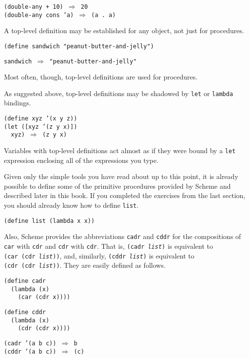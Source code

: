 \begin{alltt}
(double-any + 10) \(\Rightarrow\) 20
(double-any cons 'a) \(\Rightarrow\) (a . a)
\end{alltt}


A top-level definition may be established for any object, not just
for procedures.


\begin{alltt}
(define sandwich "peanut-butter-and-jelly")

sandwich \(\Rightarrow\) "peanut-butter-and-jelly"
\end{alltt}


\label{start_s80}Most often, though, top-level definitions are
used for procedures.


\label{start_s81}As suggested above, top-level definitions may be shadowed
by \texttt{let} or \texttt{lambda} bindings.


\begin{alltt}
(define xyz '(x y z))
(let ([xyz '(z y x)])
  xyz) \(\Rightarrow\) (z y x)
\end{alltt}


Variables with top-level definitions act almost as if they were bound
by a \texttt{let} expression enclosing all of the expressions you type.


\label{start_defn_list}Given only the simple tools you have read about up to this point,
it is already possible to define some of the primitive procedures
provided by Scheme and described later in this book.
If you completed the exercises from the last section, you should
already know how to define \label{start_s82}\texttt{list}.


\texttt{(define list (lambda x x))}

Also, Scheme provides the abbreviations \label{start_s83}\texttt{cadr} and \label{start_s84}\texttt{cddr} for
the compositions of \texttt{car} with \texttt{cdr} and \texttt{cdr} with \texttt{cdr}.
That is, \texttt{(cadr \textit{list})} is equivalent to
\texttt{(car (cdr \textit{list}))}, and, similarly,
\texttt{(cddr \textit{list})} is equivalent to
\texttt{(cdr (cdr \textit{list}))}.
They are easily defined as follows.


\begin{alltt}
(define cadr
  (lambda (x)
    (car (cdr x))))

(define cddr
  (lambda (x)
    (cdr (cdr x))))
\end{alltt}


\begin{alltt}
(cadr '(a b c)) \(\Rightarrow\) b
(cddr '(a b c)) \(\Rightarrow\) (c)
\end{alltt}


